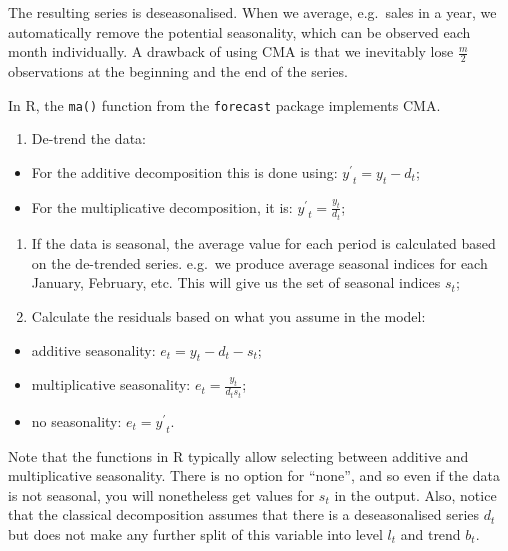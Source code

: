 \documentclass[
]{book}
\providecommand{\tightlist}{%
  \setlength{\itemsep}{0pt}\setlength{\parskip}{0pt}}
\theoremstyle{definition}
\theoremstyle{definition}
\theoremstyle{definition}
\theoremstyle{definition}
\theoremstyle{remark}
\begin{document}
The resulting series is deseasonalised. When we average, e.g.~sales in a year, we automatically remove the potential seasonality, which can be observed each month individually. A drawback of using CMA is that we inevitably lose \(\frac{m}{2}\) observations at the beginning and the end of the series.

In R, the \texttt{ma()} function from the \texttt{forecast} package implements CMA.

\begin{enumerate}
\def\labelenumi{\arabic{enumi}.}
\setcounter{enumi}{2}
\tightlist
\item
  De-trend the data:
\end{enumerate}

\begin{itemize}
\tightlist
\item
  For the additive decomposition this is done using: \({y^\prime}_t = y_t -d_t\);
\item
  For the multiplicative decomposition, it is: \({y^\prime}_t = \frac{y_t}{d_t}\);
\end{itemize}

\begin{enumerate}
\def\labelenumi{\arabic{enumi}.}
\setcounter{enumi}{3}
\tightlist
\item
  If the data is seasonal, the average value for each period is calculated based on the de-trended series. e.g.~we produce average seasonal indices for each January, February, etc. This will give us the set of seasonal indices \(s_t\);
\item
  Calculate the residuals based on what you assume in the model:
\end{enumerate}

\begin{itemize}
\tightlist
\item
  additive seasonality: \(e_t = y_t -d_t -s_t\);
\item
  multiplicative seasonality: \(e_t = \frac{y_t}{d_t s_t}\);
\item
  no seasonality: \(e_t = {y^\prime}_t\).
\end{itemize}

Note that the functions in R typically allow selecting between additive and multiplicative seasonality. There is no option for ``none'', and so even if the data is not seasonal, you will nonetheless get values for \(s_t\) in the output. Also, notice that the classical decomposition assumes that there is a deseasonalised series \(d_t\) but does not make any further split of this variable into level \(l_t\) and trend \(b_t\).
\end{document}

